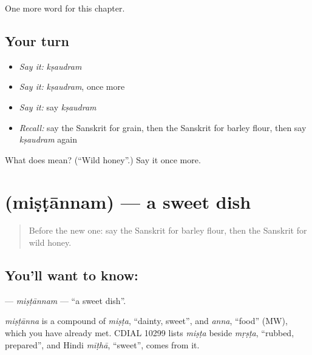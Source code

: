 \begin{grammarlens}[title={What you've built}]
One more word for this chapter.
\end{grammarlens}

\subsection*{Your turn}
\begin{itemize}
\raggedright
  \item \emph{Say it:} \emph{kṣaudram}
  \item \emph{Say it:} \emph{kṣaudram}, once more
  \item \emph{Say it:} say \emph{kṣaudram}
  \item \emph{Recall:} say the Sanskrit for grain, then the Sanskrit for barley flour, then say \emph{kṣaudram} again
\end{itemize}

\begin{tcolorbox}[breakable,colback=teal!4,colframe=teal!35!black,title={Before you move on}]
What does  mean? (\textquotedblleft{}Wild honey\textquotedblright{}.) Say it once more.
\end{tcolorbox}
\section[\texorpdfstring{\sk{मिष्टान्नम्} (miṣṭānnam)}{मिष्टान्नम् (miṣṭānnam)}]{ (miṣṭānnam) — a sweet dish}

\label{lesson:SA-C246-mistannam}



\begin{quote}
Before the new one: say the Sanskrit for barley flour, then the Sanskrit for wild honey.
\end{quote}

\subsection*{You'll want to know: }
\textbf{} — \emph{miṣṭānnam} — \textquotedblleft{}a sweet dish\textquotedblright{}.

\begin{cousinweb}
\emph{miṣṭānna} is a compound of \emph{miṣṭa}, \textquotedblleft{}dainty, sweet\textquotedblright{}, and \emph{anna}, \textquotedblleft{}food\textquotedblright{} (MW), which you have already met. CDIAL 10299 lists \emph{miṣṭa} beside \emph{mṛṣṭa}, \textquotedblleft{}rubbed, prepared\textquotedblright{}, and Hindi \emph{mīṭhā}, \textquotedblleft{}sweet\textquotedblright{}, comes from it.
\end{cousinweb}

